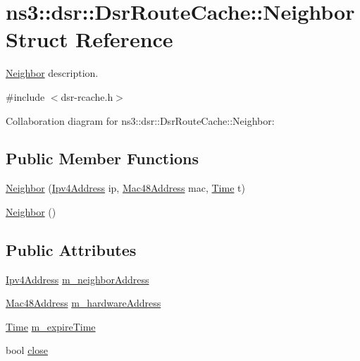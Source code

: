 \hypertarget{structns3_1_1dsr_1_1DsrRouteCache_1_1Neighbor}{}\section{ns3\+:\+:dsr\+:\+:Dsr\+Route\+Cache\+:\+:Neighbor Struct Reference}
\label{structns3_1_1dsr_1_1DsrRouteCache_1_1Neighbor}


\hyperlink{structns3_1_1dsr_1_1DsrRouteCache_1_1Neighbor}{Neighbor} description.  




{\ttfamily \#include $<$dsr-\/rcache.\+h$>$}



Collaboration diagram for ns3\+:\+:dsr\+:\+:Dsr\+Route\+Cache\+:\+:Neighbor\+:
\subsection*{Public Member Functions}
\begin{DoxyCompactItemize}
\item 
\hyperlink{structns3_1_1dsr_1_1DsrRouteCache_1_1Neighbor_a4d687b58267d9838f6db46c0cfb63461}{Neighbor} (\hyperlink{classns3_1_1Ipv4Address}{Ipv4\+Address} ip, \hyperlink{classns3_1_1Mac48Address}{Mac48\+Address} mac, \hyperlink{classns3_1_1Time}{Time} t)
\item 
\hyperlink{structns3_1_1dsr_1_1DsrRouteCache_1_1Neighbor_a9711710e596dfbd576865cbc5735c28b}{Neighbor} ()
\end{DoxyCompactItemize}
\subsection*{Public Attributes}
\begin{DoxyCompactItemize}
\item 
\hyperlink{classns3_1_1Ipv4Address}{Ipv4\+Address} \hyperlink{structns3_1_1dsr_1_1DsrRouteCache_1_1Neighbor_a8ee3b595da80c8519c195deaacf5f45f}{m\+\_\+neighbor\+Address}
\item 
\hyperlink{classns3_1_1Mac48Address}{Mac48\+Address} \hyperlink{structns3_1_1dsr_1_1DsrRouteCache_1_1Neighbor_a38721f7b0158027749aceceebdd2157d}{m\+\_\+hardware\+Address}
\item 
\hyperlink{classns3_1_1Time}{Time} \hyperlink{structns3_1_1dsr_1_1DsrRouteCache_1_1Neighbor_ac30232cb5c074b4fb3d6f45216fdb553}{m\+\_\+expire\+Time}
\item 
bool \hyperlink{structns3_1_1dsr_1_1DsrRouteCache_1_1Neighbor_ac43a90853cf07a1af19d303f0914c76b}{close}
\end{DoxyCompactItemize}


